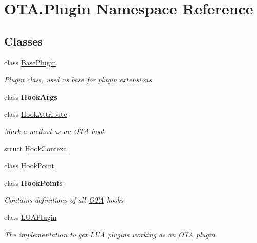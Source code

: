 \hypertarget{namespace_o_t_a_1_1_plugin}{}\section{O\+T\+A.\+Plugin Namespace Reference}
\label{namespace_o_t_a_1_1_plugin}
\subsection*{Classes}
\begin{DoxyCompactItemize}
\item 
class \hyperlink{class_o_t_a_1_1_plugin_1_1_base_plugin}{Base\+Plugin}
\begin{DoxyCompactList}\small\item\em \hyperlink{namespace_o_t_a_1_1_plugin}{Plugin} class, used as base for plugin extensions \end{DoxyCompactList}\item 
class {\bfseries Hook\+Args}
\item 
class \hyperlink{class_o_t_a_1_1_plugin_1_1_hook_attribute}{Hook\+Attribute}
\begin{DoxyCompactList}\small\item\em Mark a method as an \hyperlink{namespace_o_t_a}{O\+T\+A} hook \end{DoxyCompactList}\item 
struct \hyperlink{struct_o_t_a_1_1_plugin_1_1_hook_context}{Hook\+Context}
\item 
class \hyperlink{class_o_t_a_1_1_plugin_1_1_hook_point}{Hook\+Point}
\item 
class {\bfseries Hook\+Points}
\begin{DoxyCompactList}\small\item\em Contains definitions of all \hyperlink{namespace_o_t_a}{O\+T\+A} hooks \end{DoxyCompactList}\item 
class \hyperlink{class_o_t_a_1_1_plugin_1_1_l_u_a_plugin}{L\+U\+A\+Plugin}
\begin{DoxyCompactList}\small\item\em The implementation to get L\+U\+A plugins working as an \hyperlink{namespace_o_t_a}{O\+T\+A} plugin \end{DoxyCompactList}\end{DoxyCompactItemize}
